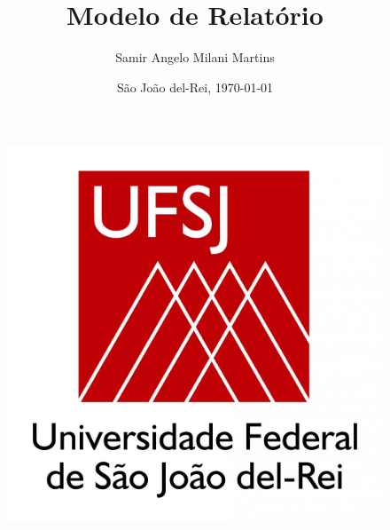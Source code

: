\documentclass[12pt,titlepage]{article}
\begin{document}
\author{Samir Angelo Milani Martins}


\date{São João del-Rei, \today}

\title{Modelo de Relatório}
\pagestyle{fancy}

\lfoot{} \rfoot{ \hfill \small \thepage/\pageref{lastpage}} \cfoot{} \chead{}
 \lhead{\small }

\thispagestyle{empty}

\vfill


\begin{figure}[htb] 
       	\begin{center}
       	\includegraphics[angle=0, scale=.1]{ufsj_logo.jpg}\\       	
       	\end{center}
   \end{figure}
  
\end{document}
